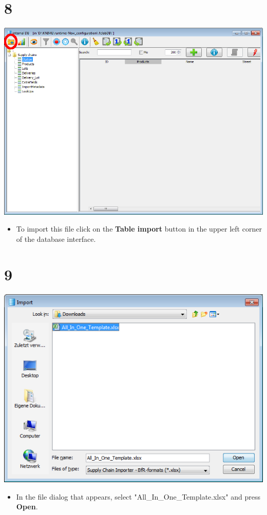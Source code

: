 \documentclass{beamer}
\begin{document}
\section{8}
\begin{frame}
	\begin{center}
  		\includegraphics[height=0.6\textheight]{8.png}
	\end{center}
	\begin{itemize}
		\item To import this file click on the \textbf{Table import} button in the upper left corner of the database interface.
	\end{itemize}
\end{frame}

\section{9}
\begin{frame}
	\begin{center}
  		\includegraphics[height=0.5\textheight]{9.png}
	\end{center}
	\begin{itemize}
		\item In the file dialog that appears, select "All\_In\_One\_Template.xlsx" and press \textbf{Open}.
	\end{itemize}
\end{frame}
\end{document}
